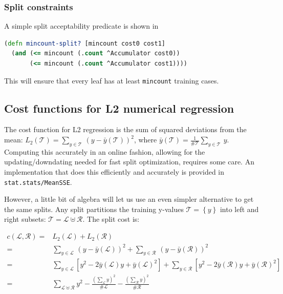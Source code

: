 \documentclass[10pt,openany]{article}
\numberwithin{definition}{section}
\numberwithin{example}{section}
\numberwithin{equation}{section}
\numberwithin{figure}{section}
\begin{document}
\subsubsection{Split constraints}

A simple split acceptability predicate is shown in

\begin{minipage}[t]{1\columnwidth}%
\begin{lstlisting}[caption={Minimum amount of training data in a leaf},label={lis:mincount-split},language=clojure,tabsize=2]
(defn mincount-split? [mincount cost0 cost1]
  (and (<= mincount (.count ^Accumulator cost0))
       (<= mincount (.count ^Accumulator cost1)))) 
\end{lstlisting}
%
\end{minipage}

This will ensure that every leaf has at least \texttt{mincount} training
cases.

\subsection{Cost functions for L2 numerical regression}

The cost function for L2 regression is the sum of squared deviations
from the mean: $L_{2}\left(\mathcal{T}\right)=\sum_{y\in\mathcal{T}}\,\left(y-\bar{y}\left(\mathcal{T}\right)\right)^{2}$,
where $\bar{y}\left(\mathcal{T}\right)=\frac{1}{\#\mathcal{T}}\sum_{y\in\mathcal{T}}\,y$.
Computing this accurately in an online fashion, allowing for the updating/downdating
needed for fast split optimization, requires some care. An implementation
that does this efficiently and accurately is provided in \texttt{stat.stats/MeanSSE}.

However, a little bit of algebra will let us use an even simpler alternative
to get the same splits. Any split partitions the training y-values
$\mathcal{T=}\left\{ y\right\} $ into left and right subsets: $\mathcal{T}=\mathcal{L}\uplus\mathcal{R}$.
The split cost is:

\begin{align*}
c\left(\mathcal{L},\mathcal{R}\right)= & L_{2}\left(\mathcal{L}\right)+L_{2}\left(\mathcal{R}\right)\\
= & \sum_{y\in\mathcal{L}}\,\left(y-\bar{y}\left(\mathcal{L}\right)\right)^{2}+\sum_{y\in\mathcal{R}}\,\left(y-\bar{y}\left(\mathcal{R}\right)\right)^{2}\\
= & \sum_{y\in\mathcal{L}}\left[y^{2}-2\bar{y}\left(\mathcal{L}\right)y+\bar{y}\left(\mathcal{L}\right)^{2}\right]+\sum_{y\in\mathcal{R}}\left[y^{2}-2\bar{y}\left(\mathcal{R}\right)y+\bar{y}\left(\mathcal{R}\right)^{2}\right]\\
= & \sum_{\mathcal{L}\uplus\mathcal{R}}y^{2}-\frac{\left(\sum_{\mathcal{L}}y\right)^{2}}{\#\mathcal{L}}-\frac{\left(\sum_{\mathcal{R}}y\right)^{2}}{\#\mathcal{R}}
\end{align*}
\end{document}
